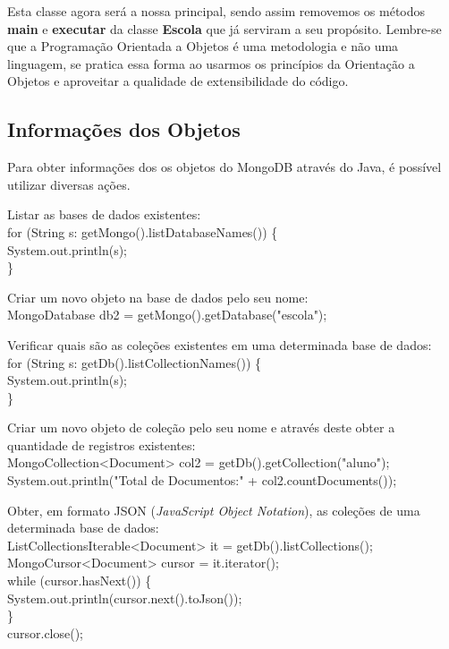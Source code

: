 \documentclass[a4paper,11pt]{article}
\begin{document}
Esta classe agora será a nossa principal, sendo assim removemos os métodos \textbf{main} e \textbf{executar} da classe \textbf{Escola} que já serviram a seu propósito. Lembre-se que a Programação Orientada a Objetos é uma metodologia e não uma linguagem, se pratica essa forma ao usarmos os princípios da Orientação a Objetos e aproveitar a qualidade de extensibilidade do código.

\subsection{Informações dos Objetos}
Para obter informações dos os objetos do MongoDB através do Java, é possível utilizar diversas ações. 

Listar as bases de dados existentes: \\
{\ttfamily for (String s: getMongo().listDatabaseNames()) \{ \\
\phantom{x}\hspace{4pt} System.out.println(s); \\
\} }

Criar um novo objeto na base de dados pelo seu nome: \\
{\ttfamily MongoDatabase db2 = getMongo().getDatabase("escola");}

Verificar quais são as coleções existentes em uma determinada base de dados: \\
{\ttfamily for (String s: getDb().listCollectionNames()) \{ \\
\phantom{x}\hspace{4pt} System.out.println(s); \\
\}}

Criar um novo objeto de coleção pelo seu nome e através deste obter a quantidade de registros existentes: \\
{\ttfamily MongoCollection<Document> col2 = getDb().getCollection("aluno"); \\
System.out.println("Total de Documentos:" + col2.countDocuments());}

Obter, em formato JSON (\textit{JavaScript Object Notation}), as coleções de uma determinada base de dados: \\
{\ttfamily ListCollectionsIterable<Document> it = getDb().listCollections(); \\
MongoCursor<Document> cursor = it.iterator(); \\
while (cursor.hasNext()) \{ \\
\phantom{x}\hspace{4pt} System.out.println(cursor.next().toJson()); \\
\} \\
cursor.close();}
\end{document}

